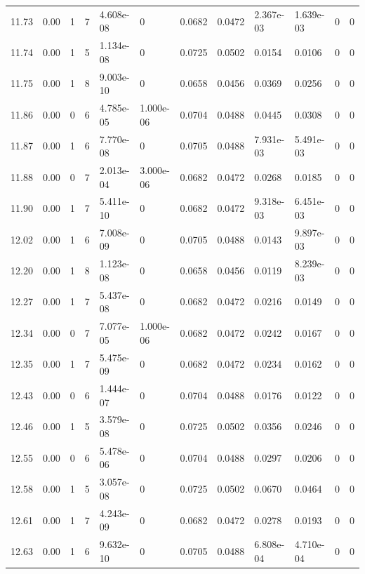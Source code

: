 \documentclass[preview]{standalone}
\begin{document}
{{{{{{\begin{tabular}{L{1.2cm}C{1.2cm} C{0.3cm}C{0.5cm} C{1.4cm}C{1.4cm} C{1.4cm}C{1.4cm} C{1.6cm}C{1.6cm} C{1.6cm}C{1.6cm}}
  11.73  &  0.00  & 1     &  7 &  4.608e-08  & 0  &  0.0682&   0.0472& 2.367e-03 & 1.639e-03   &  0 & 0  \\ 
  11.74  &  0.00  & 1     &  5 &  1.134e-08  & 0  &  0.0725&   0.0502& 0.0154 & 0.0106   &  0 & 0  \\ 
  11.75  &  0.00  & 1     &  8 &  9.003e-10  & 0  &  0.0658&   0.0456& 0.0369 & 0.0256   &  0 & 0  \\ 
  11.86  &  0.00  & 0     &  6 &  4.785e-05  & 1.000e-06  &  0.0704&   0.0488& 0.0445 & 0.0308   &  0 & 0  \\ 
  11.87  &  0.00  & 1     &  6 &  7.770e-08  & 0  &  0.0705&   0.0488& 7.931e-03 & 5.491e-03   &  0 & 0  \\ 
  11.88  &  0.00  & 0     &  7 &  2.013e-04  & 3.000e-06  &  0.0682&   0.0472& 0.0268 & 0.0185   &  0 & 0  \\ 
  11.90  &  0.00  & 1     &  7 &  5.411e-10  & 0  &  0.0682&   0.0472& 9.318e-03 & 6.451e-03   &  0 & 0  \\ 
  12.02  &  0.00  & 1     &  6 &  7.008e-09  & 0  &  0.0705&   0.0488& 0.0143 & 9.897e-03   &  0 & 0  \\ 
  12.20  &  0.00  & 1     &  8 &  1.123e-08  & 0  &  0.0658&   0.0456& 0.0119 & 8.239e-03   &  0 & 0  \\ 
  12.27  &  0.00  & 1     &  7 &  5.437e-08  & 0  &  0.0682&   0.0472& 0.0216 & 0.0149   &  0 & 0  \\ 
  12.34  &  0.00  & 0     &  7 &  7.077e-05  & 1.000e-06  &  0.0682&   0.0472& 0.0242 & 0.0167   &  0 & 0  \\ 
  12.35  &  0.00  & 1     &  7 &  5.475e-09  & 0  &  0.0682&   0.0472& 0.0234 & 0.0162   &  0 & 0  \\ 
  12.43  &  0.00  & 0     &  6 &  1.444e-07  & 0  &  0.0704&   0.0488& 0.0176 & 0.0122   &  0 & 0  \\ 
  12.46  &  0.00  & 1     &  5 &  3.579e-08  & 0  &  0.0725&   0.0502& 0.0356 & 0.0246   &  0 & 0  \\ 
  12.55  &  0.00  & 0     &  6 &  5.478e-06  & 0  &  0.0704&   0.0488& 0.0297 & 0.0206   &  0 & 0  \\ 
  12.58  &  0.00  & 1     &  5 &  3.057e-08  & 0  &  0.0725&   0.0502& 0.0670 & 0.0464   &  0 & 0  \\ 
  12.61  &  0.00  & 1     &  7 &  4.243e-09  & 0  &  0.0682&   0.0472& 0.0278 & 0.0193   &  0 & 0  \\ 
  12.63  &  0.00  & 1     &  6 &  9.632e-10  & 0  &  0.0705&   0.0488& 6.808e-04 & 4.710e-04   &  0 & 0  \\ 

\end{tabular}}}}}}}
\end{document}
